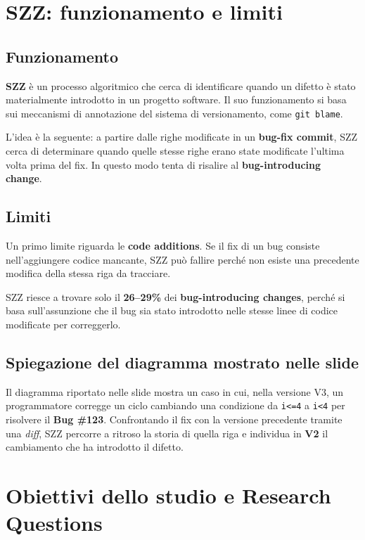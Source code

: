 \section{SZZ: funzionamento e limiti}

\subsection{Funzionamento}

\textbf{SZZ} è un processo algoritmico che cerca di identificare quando un difetto è stato materialmente introdotto in un progetto software. Il suo funzionamento si basa sui meccanismi di annotazione del sistema di versionamento, come \texttt{git blame}.

L'idea è la seguente: a partire dalle righe modificate in un \textbf{bug-fix commit}, SZZ cerca di determinare quando quelle stesse righe erano state modificate l'ultima volta prima del fix. In questo modo tenta di risalire al \textbf{bug-introducing change}.

\subsection{Limiti}

Un primo limite riguarda le \textbf{code additions}. Se il fix di un bug consiste nell'aggiungere codice mancante, SZZ può fallire perché non esiste una precedente modifica della stessa riga da tracciare.

\begin{notaslide}
SZZ riesce a trovare solo il \textbf{26--29\%} dei \textbf{bug-introducing changes}, perché si basa sull'assunzione che il bug sia stato introdotto nelle stesse linee di codice modificate per correggerlo.
\end{notaslide}

\subsection{Spiegazione del diagramma mostrato nelle slide}

Il diagramma riportato nelle slide mostra un caso in cui, nella versione V3, un programmatore corregge un ciclo cambiando una condizione da \texttt{i<=4} a \texttt{i<4} per risolvere il \textbf{Bug \#123}. Confrontando il fix con la versione precedente tramite una \emph{diff}, SZZ percorre a ritroso la storia di quella riga e individua in \textbf{V2} il cambiamento che ha introdotto il difetto.

\section{Obiettivi dello studio e Research Questions}

